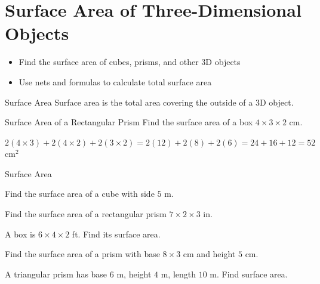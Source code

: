 \section{Surface Area of Three-Dimensional Objects}

\begin{learningGoals}
\begin{itemize}
    \item Find the surface area of cubes, prisms, and other 3D objects
    \item Use nets and formulas to calculate total surface area
\end{itemize}
\end{learningGoals}

\begin{conceptBox}{Surface Area}
Surface area is the total area covering the outside of a 3D object.
\end{conceptBox}

\begin{workedExample}{Surface Area of a Rectangular Prism}
Find the surface area of a box $4 \times 3 \times 2$ cm.

$2(4 \times 3) + 2(4 \times 2) + 2(3 \times 2) = 2(12) + 2(8) + 2(6) = 24 + 16 + 12 = 52$ cm$^2$
\end{workedExample}


\begin{practiceBox}{Surface Area}
\resetProblems

\prob Find the surface area of a cube with side $5$ m.

\prob Find the surface area of a rectangular prism $7 \times 2 \times 3$ in.

\prob A box is $6 \times 4 \times 2$ ft. Find its surface area.

\prob Find the surface area of a prism with base $8 \times 3$ cm and height $5$ cm.

\prob A triangular prism has base $6$ m, height $4$ m, length $10$ m. Find surface area.

\end{practiceBox}
